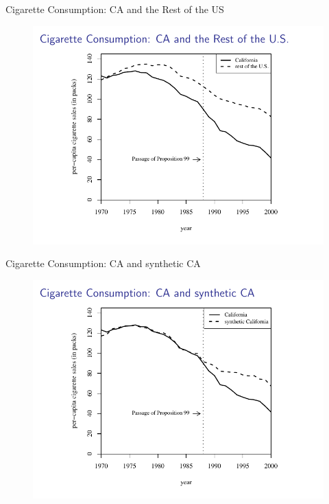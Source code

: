 \documentclass{beamer}
\begin{document}
\begin{frame}{Cigarette Consumption: CA and the Rest of the US}
	
	\begin{figure}
	\includegraphics[scale=0.75]{./lecture_includes/abadie_3.pdf}
	\end{figure}
\end{frame}

\begin{frame}{Cigarette Consumption: CA and synthetic CA}
	
	\begin{figure}
	\includegraphics[scale=0.75]{./lecture_includes/abadie_4.pdf}
	\end{figure}
\end{frame}
\end{document}
